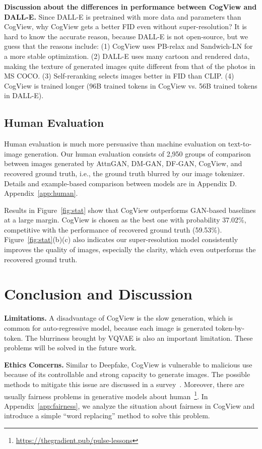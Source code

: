 \textbf{Discussion about the differences in performance between CogView and DALL-E.} Since DALL-E is pretrained with more data and parameters than CogView, why CogView gets a better FID even without super-resolution? It is hard to know the accurate reason, because DALL-E is not open-source, but we guess that the reasons include: (1) CogView uses PB-relax and Sandwich-LN for a more stable optimization. (2) DALL-E uses many cartoon and rendered data, making the texture of generated images quite different from that of the photos in MS COCO. (3) Self-reranking selects images better in FID than CLIP. (4) CogView is trained longer  (96B trained tokens in CogView vs. 56B trained tokens in DALL-E).
\subsection{Human Evaluation} \label{sec:human}
Human evaluation is much more persuasive than machine evaluation on text-to-image generation. Our human evaluation consists of 2,950 groups of comparison between images generated by AttnGAN, DM-GAN, DF-GAN, CogView, and recovered ground truth, i.e., the ground truth blurred by our image tokenizer. Details and example-based comparison between models are in \ifblind Appendix D.
\else 
Appendix~\ref{app:human}. 
\fi

Results in Figure~\ref{fig:stat} show that CogView outperforms GAN-based baselines at a large margin. CogView is chosen as the best one with probability 37.02\%, competitive with the performance of recovered ground truth (59.53\%). Figure~\ref{fig:stat}(b)(c) also indicates our super-resolution model consistently improves the quality of images, especially the clarity, which even outperforms the recovered ground truth.

\section{Conclusion and Discussion}
\textbf{Limitations.} A disadvantage of CogView is the slow generation, which is common for auto-regressive model, because each image is generated token-by-token. The blurriness brought by VQVAE is also an important limitation. These problems will be solved in the future work.

\textbf{Ethics Concerns.} Similar to Deepfake, CogView is vulnerable to malicious use~\cite{westerlund2019emergence} because of its controllable and strong capacity to generate images. The possible methods to mitigate this issue are discussed in a survey~\cite{brundage2018malicious}. Moreover, there are usually fairness problems in generative models about human~\footnote{\url{https://thegradient.pub/pulse-lessons}}. In Appendix~\ref{app:fairness}, we analyze the situation about fairness in CogView and introduce a simple ``word replacing'' method to solve this problem.

